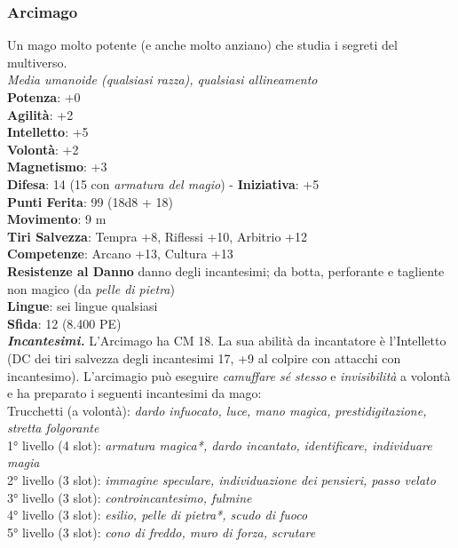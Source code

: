 \begin{multicols}{2}
\subsubsection{Arcimago}
Un mago molto potente (e anche molto anziano) che studia i segreti del multiverso.\\
\emph{Media umanoide (qualsiasi razza), qualsiasi allineamento}\\
\textbf{Potenza}: +0\\
\textbf{Agilità}: +2\\
\textbf{Intelletto}: +5\\
\textbf{Volontà}: +2\\
\textbf{Magnetismo}: +3\\
\textbf{Difesa}: 14 (15 con \emph{armatura del magio}) - \textbf{Iniziativa}: +5\\
\textbf{Punti Ferita}: 99 (18d8 + 18)\\
\textbf{Movimento}: 9 m\\
\textbf{Tiri Salvezza}: Tempra +8, Riflessi +10, Arbitrio +12 \\
\textbf{Competenze}: Arcano +13, Cultura +13\\
\textbf{Resistenze al Danno} danno degli incantesimi; da botta, perforante e tagliente non magico (da \emph{pelle di pietra})\\
\textbf{Lingue}: sei lingue qualsiasi\\
\textbf{Sfida}: 12 (8.400 PE)\smallskip\\
\emph{\textbf{Incantesimi.}} L'Arcimago ha CM 18. La sua abilità da incantatore è l'Intelletto (DC dei tiri salvezza degli incantesimi 17, +9 al colpire con attacchi con incantesimo). L'arcimagio può eseguire \emph{camuffare sé stesso} e \emph{invisibilità} a volontà e ha preparato i seguenti incantesimi da mago:\\
Trucchetti (a volontà): \emph{dardo infuocato, luce, mano magica,} \emph{prestidigitazione, stretta folgorante}\\
1° livello (4 slot): \emph{armatura magica*, dardo incantato,} \emph{identificare, individuare magia}\\
2° livello (3 slot): \emph{immagine speculare, individuazione dei} \emph{pensieri, passo velato}\\
3° livello (3 slot): \emph{controincantesimo, fulmine}\\
4° livello (3 slot): \emph{esilio, pelle di pietra*, scudo di fuoco}\\
5° livello (3 slot): \emph{cono di freddo, muro di forza, scrutare}\\

\end{multicols}
